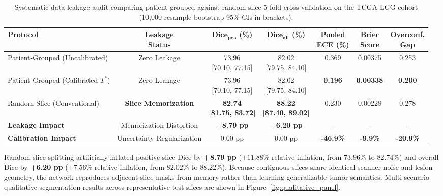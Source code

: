 \documentclass[preprint,12pt,authoryear]{elsarticle}
\begin{document}
\begin{table}[tbp]
\centering
\caption{Systematic data leakage audit comparing patient-grouped against random-slice 5-fold cross-validation on the TCGA-LGG cohort (10,000-resample bootstrap 95\% CIs in brackets).}
\label{tab:leakage_audit}
\setlength{\tabcolsep}{2.5pt}
\renewcommand{\arraystretch}{0.96}
\scriptsize
\begin{tabular*}{\textwidth}{@{\extracolsep{\fill}}lcccccc}
\toprule
\textbf{Protocol} & \shortstack{\textbf{Leakage} \\ \textbf{Status}} & \shortstack{$\mathbf{\text{Dice}_{\text{pos}}}$ \\ \textbf{(\%)}} & \shortstack{$\mathbf{\text{Dice}_{\text{all}}}$ \\ \textbf{(\%)}} & \shortstack{\textbf{Pooled} \\ \textbf{ECE (\%)}} & \shortstack{\textbf{Brier} \\ \textbf{Score}} & \shortstack{\textbf{Overconf.} \\ \textbf{Gap}} \\
\midrule
Patient-Grouped (Uncalibrated) & Zero Leakage & \shortstack{73.96 \\ {[70.10, 77.15]}} & \shortstack{82.02 \\ {[79.75, 84.10]}} & 0.369 & 0.00375 & 0.253 \\
Patient-Grouped (Calibrated $T^*$) & Zero Leakage & \shortstack{73.96 \\ {[70.10, 77.15]}} & \shortstack{82.02 \\ {[79.75, 84.10]}} & \textbf{0.196} & \textbf{0.00338} & \textbf{0.200} \\
Random-Slice (Conventional) & \textbf{Slice Memorization} & \shortstack{\textbf{82.74} \\ \textbf{[81.75, 83.72]}} & \shortstack{\textbf{88.22} \\ \textbf{[87.40, 89.02]}} & 0.230 & 0.00228 & 0.278 \\
\midrule
\textbf{Leakage Impact} & Memorization Distortion & \textbf{+8.79 pp} & \textbf{+6.20 pp} & -- & -- & -- \\
\textbf{Calibration Impact} & Uncertainty Regularization & 0.00 pp & 0.00 pp & \textbf{-46.9\%} & \textbf{-9.9\%} & \textbf{-20.9\%} \\
\bottomrule
\end{tabular*}
\end{table}

Random slice splitting artificially inflated positive-slice Dice by \textbf{+8.79 pp} ($+11.88\%$ relative inflation, from $73.96\%$ to $82.74\%$) and overall Dice by \textbf{+6.20 pp} ($+7.56\%$ relative inflation, from $82.02\%$ to $88.22\%$). Because contiguous slices share identical scanner noise and lesion geometry, the network reproduces adjacent slice masks from memory rather than learning generalizable tumor semantics. Multi-scenario qualitative segmentation results across representative test slices are shown in Figure~\ref{fig:qualitative_panel}.
\end{document}
